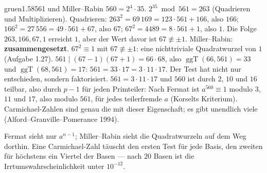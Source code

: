 \begin{loesungkarte}{gruen}{1.58}{561 und Miller--Rabin}
$560 = 2^{4}\cdot35$. $2^{35}\bmod561 = 263$ (Quadrieren und Multiplizieren). Quadrieren: $263^{2} = 69\,169 = 123\cdot561 + 166$, also $166$; $166^{2} = 27\,556 = 49\cdot561 + 67$, also $67$; $67^{2} = 4489 = 8\cdot561 + 1$, also $1$. Die Folge $263, 166, 67, 1$ erreicht $1$, aber der Wert davor ist $67\not\equiv\pm1$. Miller--Rabin: \textbf{zusammengesetzt}.
$67^{2}\equiv1$ mit $67\not\equiv\pm1$: eine nichttriviale Quadratwurzel von $1$ (Aufgabe 1.27). $561\mid(67 - 1)(67 + 1) = 66\cdot68$, also $\operatorname{ggT}(66, 561) = 33$ und $\operatorname{ggT}(68, 561) = 17$: $561 = 33\cdot17 = 3\cdot11\cdot17$. Der Test hat nicht nur entschieden, sondern faktorisiert.
$561 = 3\cdot11\cdot17$ und $560$ ist durch $2$, $10$ und $16$ teilbar, also durch $p - 1$ für jeden Primteiler: Nach Fermat ist $a^{560}\equiv1$ modulo $3$, $11$ und $17$, also modulo $561$, für jedes teilerfremde $a$ (Korselts Kriterium). Carmichael-Zahlen sind genau die mit dieser Eigenschaft; es gibt unendlich viele (Alford--Granville--Pomerance 1994).
\begin{mitnehmen}\kastentext
Fermat sieht nur $a^{n-1}$; Miller--Rabin sieht die Quadratwurzeln auf dem Weg dorthin. Eine Carmichael-Zahl täuscht den ersten Test für jede Basis, den zweiten für höchstens ein Viertel der Basen --- nach $20$ Basen ist die Irrtumswahrscheinlichkeit unter $10^{-12}$.
\end{mitnehmen}
\end{loesungkarte}

